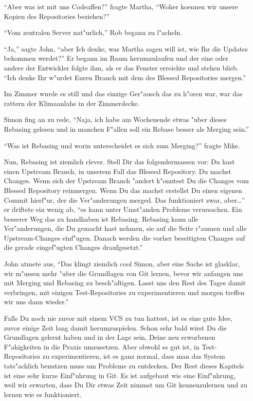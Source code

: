 \begin{trenches}
``Aber was ist mit uns Codeaffen?'' fragte Martha, ``Woher koennen wir unsere Kopien des Repositories beziehen?''

``Vom zentralen Server nat"urlich,'' Rob begann zu l"acheln.

``Ja,'' sagte John, ``aber Ich denke, was Martha sagen will ist, wie Ihr die Updates bekommen werdet?'' Er begann im Raum herumzulaufen und der eine oder andere der Entwickler folgte ihm, als er das Fenster erreichte und stehen blieb. ``Ich denke Ihr w"urdet Euren Branch mit dem des Blessed Repositories mergen.''

Im Zimmer wurde es still und das einzige Ger"ausch das zu h"oren war, war das rattern der Klimaanlahe in der Zimmerdecke.

Simon fing an zu rede, ``Naja, ich habe am Wochenende etwas "uber dieses Rebasing gelesen und in manchen F"allen soll ein Rebase besser als Merging sein.''

``Was ist Rebasing und worin unterscheidet es sich zum Merging?'' fragte Mike.

Nun, Rebasing ist ziemlich clever. Stell Dir das folgendermassen vor: Du hast einen Upstream Branch, in unserem Fall das Blessed Repository. Du machst Changes. Wenn sich der Upstream Branch "andert k"onntest Du die Changes vom Blessed Repository reinmergen. Wenn Du das machst erstellst Du einen eigenen Commit hierf"ur, der die Ver"anderungen merged. Das funktioniert zwar, aber\ldots'' er driftete ein wenig ab, ``es kann unter Umst"anden Probleme verursachen. Ein besserer Weg das zu handhaben ist Rebasing. Rebasing kann alle Ver"anderungen, die Du gemacht hast nehmen, sie auf die Seite r"aumen und alle Upstream-Changes einf"ugen. Danach werden die vorher beseitigten Changes auf die gerade eingef"ugten Changes draufgesetzt.''

John atmete aus, ``Das klingt ziemlich cool Simon, aber eine Sache ist glasklar, wir m"ussen mehr "uber die Grundlagen von Git lernen, bevor wir anfangen uns mit Merging und Rebasing zu besch"aftigen. Lasst uns den Rest des Tages damit verbringen, mit einigen Test-Repositories zu experimentieren und morgen treffen wir uns dann wieder.''
\end{trenches}

Falls Du noch nie zuvor mit einem VCS zu tun hattest, ist es eine gute Idee, zuvor einige Zeit lang damit herumzuspielen. Schon sehr bald wirst Du die Grundlagen gelernt haben und in der Lage sein, Deine neu erworbenen F"ahigkeiten in die Praxis umzusetzen. Aber obwohl es gut ist, in Test-Repositories zu experimentieren, ist es ganz normal, dass man das System tats"achlich benutzen muss um Probleme zu entdecken. Der Rest dieses Kapitels ist eine sehr kurze Einf"uhrung in Git. Es ist aufgebaut wie eine Einf"uhrung, weil wir erwarten, dass Du Dir etwas Zeit nimmst um Git kennenzulernen und zu lernen wie es funktioniert.

